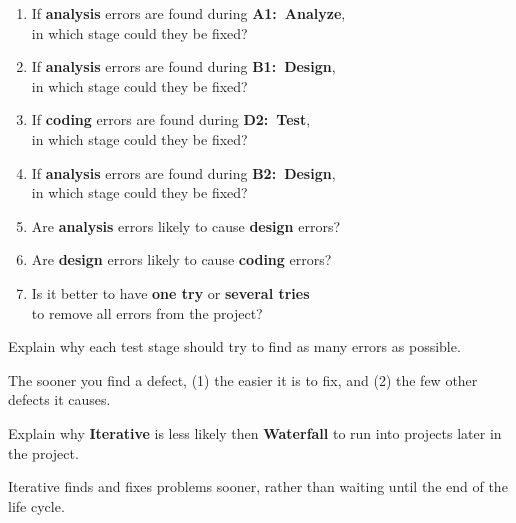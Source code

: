 \begin{enumerate}%

\item If \textbf{analysis} errors are found during \textbf{A1:~Analyze}, \\ in which stage could they be fixed?

\item If \textbf{analysis} errors are found during \textbf{B1:~Design}, \\ in which stage could they be fixed?

\item If \textbf{coding} errors are found during \textbf{D2:~Test}, \\ in which stage could they be fixed?

\item If \textbf{analysis} errors are found during \textbf{B2:~Design}, \\ in which stage could they be fixed?

\item Are \textbf{analysis} errors likely to cause \textbf{design} errors?

\item Are \textbf{design} errors likely to cause \textbf{coding} errors?

\item Is it better to have \textbf{one try} or \textbf{several tries} \\ to remove all errors from the project?

\end{enumerate}


\Q Explain why each test stage should try to find as many errors as possible.

\begin{answer}[5em]
The sooner you find a defect, (1) the easier it is to fix, and (2) the few other defects it causes.
\end{answer}


\Q Explain why \textbf{Iterative} is less likely then \textbf{Waterfall} to run into projects later in the project.

\begin{answer}[5em]
Iterative finds and fixes problems sooner, rather than waiting until the end of the life cycle.
\end{answer}


